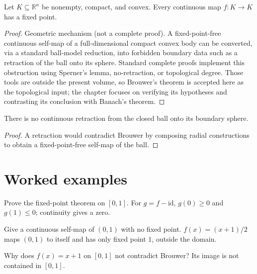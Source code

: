 \begin{theorem}\label{thm:ii17-02}
Let $K\subseteq\mathbb R^n$ be nonempty, compact, and convex. Every continuous map $f:K\to K$ has a fixed point.
\begin{proof}
Geometric mechanism (not a complete proof). A fixed-point-free continuous self-map of a full-dimensional compact convex body can be converted, via a standard ball-model reduction, into forbidden boundary data such as a retraction of the ball onto its sphere. Standard complete proofs implement this obstruction using Sperner's lemma, no-retraction, or topological degree. Those tools are outside the present volume, so Brouwer's theorem is accepted here as the topological input; the chapter focuses on verifying its hypotheses and contrasting its conclusion with Banach's theorem.
\end{proof}
\end{theorem}

\begin{theorem}\label{thm:ii17-03}
There is no continuous retraction from the closed ball onto its boundary sphere.
\begin{proof}
A retraction would contradict Brouwer by composing radial constructions to obtain a fixed-point-free self-map of the ball.
\end{proof}
\end{theorem}

\section{Worked examples}

\begin{example}\label{ex:ii17-worked-01}
Prove the fixed-point theorem on $[0,1]$. For $g=f-\mathrm{id}$, $g(0)\ge0$ and $g(1)\le0$; continuity gives a zero.
\end{example}

\begin{example}\label{ex:ii17-worked-02}
Give a continuous self-map of $(0,1)$ with no fixed point. $f(x)=(x+1)/2$ maps $(0,1)$ to itself and has only fixed point $1$, outside the domain.
\end{example}

\begin{example}\label{ex:ii17-worked-03}
Why does $f(x)=x+1$ on $[0,1]$ not contradict Brouwer? Its image is not contained in $[0,1]$.
\end{example}

